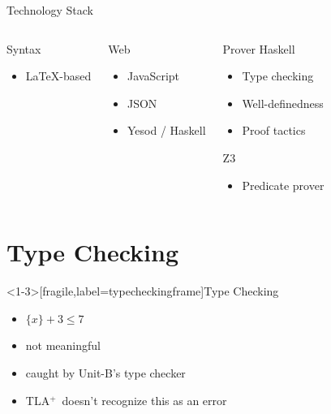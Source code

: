 \documentclass[10pt]{beamer}
\newcommand{\unitb}{Unit-B\xspace}
\newcommand{\tla}{TLA${}^+$\xspace}
\begin{document}
\begin{frame}[fragile]{Technology Stack}
  \begin{columns}[T,onlytextwidth]
      \begin{block}{Syntax}
        \begin{itemize}
        \item \textrm{\LaTeX}-based
        \end{itemize}
      \end{block}
      \pause
      \begin{block}{Web}
        \begin{itemize}
        \item JavaScript
        \item JSON
        \item Yesod / Haskell
        \end{itemize}
      \end{block}
      \pause

      \begin{block}{Prover}
        Haskell
        \begin{itemize}
        \item Type checking
        \item Well-definedness
        \item Proof tactics
        \end{itemize}
        Z3
        \begin{itemize}
        \item Predicate prover
        \end{itemize}
      \end{block}
  \end{columns}
\end{frame}


\section{Type Checking}

\begin{frame}<1-3>[fragile,label=typecheckingframe]{Type Checking}
  \begin{itemize}
  \item <1-> $\{x\}+3 \le 7$
  \item <2-> not meaningful
  \item <3-> caught by \unitb's type checker
  \item <4-> \tla\ doesn't recognize this as an error
  \end{itemize}
\end{frame}
\end{document}
